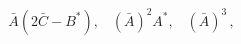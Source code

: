 \begin{equation*}
\bar{A}(2\bar{C}-B^{\ast }),\;\;\;(\bar{A})^{2}A^{\ast },\;\;\;(\bar{A}%
)^{3}\,,
\end{equation*}

